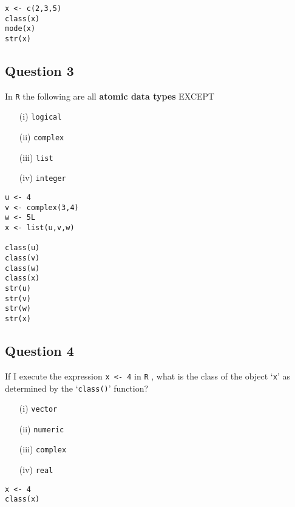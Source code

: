 \documentclass[12pt]{article}
\begin{document}
\begin{framed}
\begin{verbatim}
x <- c(2,3,5)
class(x)
mode(x)
str(x)
\end{verbatim}
\end{framed}


\newpage
\subsection*{Question 3}
\Large
In \texttt{R} the following are all \textbf{atomic data types} EXCEPT
\begin{itemize}
	\item[(i)] \texttt{logical}
	\item[(ii)] \texttt{complex}
	\item[(iii)] \texttt{list}
	\item[(iv)] \texttt{integer}
\end{itemize}
\bigskip

\begin{framed}
\begin{verbatim}
u <- 4
v <- complex(3,4)
w <- 5L
x <- list(u,v,w)

class(u)
class(v)
class(w)
class(x)
str(u)
str(v)
str(w)
str(x)

\end{verbatim}	
\end{framed}


\newpage
\subsection*{Question 4}
\Large
If I execute the expression \texttt{x <- 4} in \texttt{R}
, what is the class of the object `\texttt{x}' as determined by the `\texttt{class()}' function?
\bigskip
\begin{itemize}
	\item[(i)] \texttt{vector}
	\item[(ii)] \texttt{numeric}
	\item[(iii)] \texttt{complex}
	\item[(iv)] \texttt{real}
\end{itemize}

\begin{framed}
\begin{verbatim}
x <- 4
class(x)
\end{verbatim}	
\end{framed}
\end{document}

